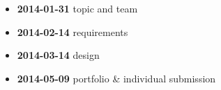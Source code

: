 \begin{itemize}
\item \textbf{2014-01-31} topic and team
\item \textbf{2014-02-14} requirements
\item \textbf{2014-03-14} design
\item \textbf{2014-05-09} portfolio \& individual submission
\end{itemize}
